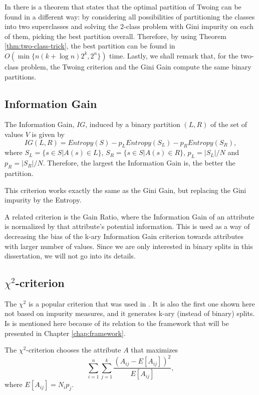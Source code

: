 In \cite{Breiman84} there is a theorem that states that the optimal partition of Twoing can be found in a different way: by considering all possibilities of partitioning the classes into two superclasses and solving the 2-class problem with Gini impurity on each of them, picking the best partition overall. Therefore, by using Theorem \ref{thm:two-class-trick}, the best partition can be found in $O(\min \{ n (k + \log n) 2^k, 2^n \} )$ time. Lastly, we shall remark that, for the two-class problem, the Twoing criterion and the Gini Gain compute the same binary partitions.

\subsection{Information Gain}

The Information Gain, $IG$, induced by a binary partition $(L,R)$ 
of the set of values $V$ is given by 
\begin{equation}
 IG(L,R) = Entropy(S) -
p_L Entropy(S_L) - p_R Entropy(S_R),
\label{eq:InformationGain}
\end{equation}
where $S_L= \{ s \in S | A(s) \in L \}$, $S_R= \{ s \in S | A(s) \in R \}$,
 $p_L=|S_L| /N $ and $p_R=|S_R| /N$. Therefore, the largest the Information Gain is, the better the partition.

This criterion works exactly the same as the Gini Gain, but replacing the Gini impurity by the Entropy.

A related criterion is the Gain Ratio, where the Information Gain of an attribute is normalized by that attribute's potential information. This is used as a way of decreasing the bias of the k-ary Information Gain criterion towards attributes with larger number of values. Since we are only interested in binary splits in this dissertation, we will not go into its details.


\subsection{$\chi^2$-criterion}
The $\chi^2$ is a popular criterion that was  used in \cite{Mingers.87}. It is also the first one shown here not based on impurity measures, and it generates k-ary (instead of binary) splits. Is is mentioned here because of its relation to the framework that will be presented in Chapter \ref{chap:framework}.

The $\chi^2$-criterion chooses the attribute $A$ that maximizes
\begin{equation}
\label{eq:chitest}
\sum_{i=1}^n \sum_{j=1}^k \frac{(A_{ij}-E[A_{ij}] )^2}{E[A_{ij}]},
\end{equation}
where $E[A_{ij}]=N_i p_j$.


